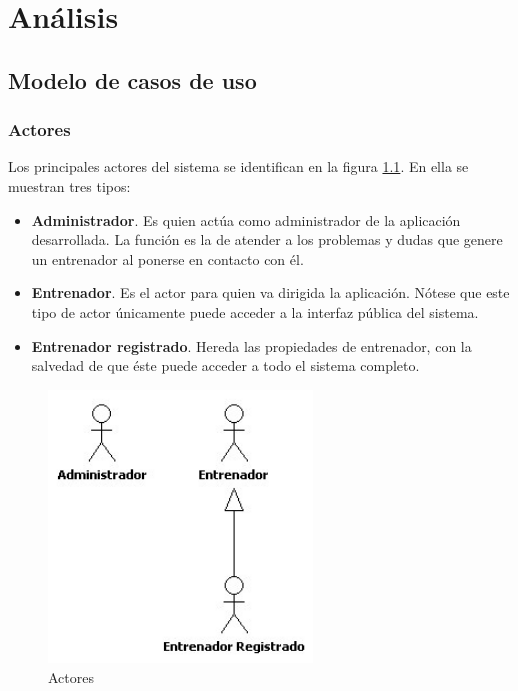 %

\chapter{Análisis} %
	\label{cha:analisis}
	
% 
%
\section{Modelo de casos de uso} %
	\label{sec:modelo_casos_de_uso}
	
	\subsection{Actores} %
		\label{sub:actores}
		
		Los principales actores del sistema se identifican en la figura \ref{fig:analisis_actores}. En ella se muestran tres tipos:
	
		\begin{itemize}
			\item {{\bf Administrador}. Es quien actúa como administrador de la aplicación desarrollada. La función es la de atender a los problemas y dudas que genere un entrenador al ponerse en contacto con él.}
			\item {{\bf Entrenador}. Es el actor para quien va dirigida la aplicación. Nótese que este tipo de actor únicamente puede acceder a la interfaz pública del sistema.}
			\item {{\bf Entrenador registrado}. Hereda las propiedades de entrenador, con la salvedad de que éste puede acceder a todo el sistema completo.}
		\end{itemize}
		
		\begin{figure}[H]
		  \centering
		    \includegraphics[width=7cm]{./eps/casos_uso/actores.eps}
		  \caption{Actores}
		  \label{fig:analisis_actores}
		\end{figure}
		
